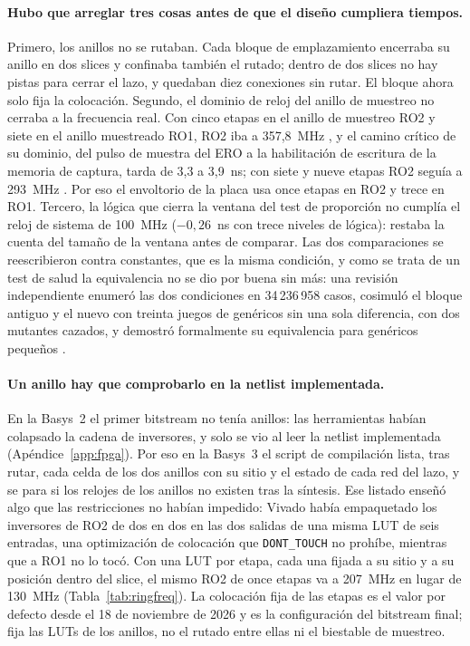 \paragraph{Hubo que arreglar tres cosas antes de que el diseño cumpliera
tiempos.} Primero, los anillos no se rutaban. Cada bloque de
emplazamiento encerraba su anillo en dos slices y confinaba también el
rutado; dentro de dos slices no hay pistas para cerrar el lazo, y
quedaban diez conexiones sin rutar. El bloque ahora solo fija la
colocación. Segundo, el dominio de reloj del anillo de muestreo no
cerraba a la frecuencia real. Con cinco etapas en el anillo de muestreo
RO2 y siete en el anillo muestreado RO1, RO2 iba a 357,8~MHz \meas{}, y
el camino crítico de su dominio, del pulso de muestra del \ac{ERO} a la
habilitación de escritura de la memoria de captura, tarda de 3,3 a
3,9~ns; con siete y nueve etapas RO2 seguía a 293~MHz \meas{}. Por eso
el envoltorio de la placa usa once etapas en RO2 y trece en RO1.
Tercero, la lógica que cierra la ventana del test de proporción no
cumplía el reloj de sistema de 100~MHz ($-0{,}26$~ns con trece niveles
de lógica): restaba la cuenta del tamaño de la ventana antes de
comparar. Las dos comparaciones se reescribieron contra constantes, que
es la misma condición, y como se trata de un test de salud la
equivalencia no se dio por buena sin más: una revisión independiente
enumeró las dos condiciones en 34\,236\,958 casos, cosimuló el bloque
antiguo y el nuevo con treinta juegos de genéricos sin una sola
diferencia, con dos mutantes cazados, y demostró formalmente su
equivalencia para genéricos pequeños \simu{}.

\paragraph{Un anillo hay que comprobarlo en la netlist implementada.} En
la Basys~2 el primer bitstream no tenía anillos: las herramientas habían
colapsado la cadena de inversores, y solo se vio al leer la netlist
implementada (Apéndice~\ref{app:fpga}). Por eso en la Basys~3 el script
de compilación lista, tras rutar, cada celda de los dos anillos con su
sitio y el estado de cada red del lazo, y se para si los relojes de los
anillos no existen tras la síntesis. Ese listado enseñó algo que las
restricciones no habían impedido: Vivado había empaquetado los
inversores de RO2 de dos en dos en las dos salidas de una misma \ac{LUT}
de seis entradas, una optimización de colocación que
\texttt{DONT\_TOUCH} no prohíbe, mientras que a RO1 no lo tocó. Con una
\ac{LUT} por etapa, cada una fijada a su sitio y a su posición dentro
del slice, el mismo RO2 de once etapas va a 207~MHz en lugar de 130~MHz
\meas{} (Tabla~\ref{tab:ringfreq}). La colocación fija de las etapas es
el valor por defecto desde el 18 de noviembre de 2026 y es la
configuración del bitstream final; fija las \acp{LUT} de los anillos, no
el rutado entre ellas ni el biestable de muestreo.

